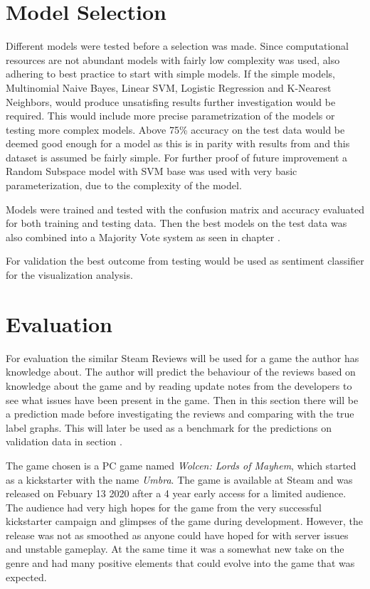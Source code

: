 \section{Model Selection}
\label{sec:model-selection}


Different models were tested before a selection was made. 
Since computational resources are not abundant models with fairly low complexity was used, also adhering to best practice to start with simple models.
If the simple models, Multinomial Naive Bayes, Linear SVM, Logistic Regression and K-Nearest Neighbors, would produce unsatisfing results further investigation would be required.
This would include more precise parametrization of the models or testing more complex models. 
Above 75\% accuracy on the test data would be deemed good enough for a model as this is in parity with results from \cite{gang-wang, rui-xia} and this dataset is assumed be fairly simple. 
For further proof of future improvement a Random Subspace model with SVM base was used with very basic parameterization, due to the complexity of the model.


Models were trained and tested with the confusion matrix and accuracy evaluated for both training and testing data.
Then the best models on the test data was also combined into a Majority Vote system as seen in chapter .


For validation the best outcome from testing would be used as sentiment classifier for the visualization analysis.


\section{Evaluation}
\label{sec:evaluation}


For evaluation the similar Steam Reviews will be used for a game the author has knowledge about. 
The author will predict the behaviour of the reviews based on knowledge about the game and by reading update notes from the developers to see what issues have been present in the game. 
Then in this section there will be a prediction made before investigating the reviews and comparing with the true label graphs. 
This will later be used as a benchmark for the predictions on validation data in section .


The game chosen is a PC game named \emph{Wolcen: Lords of Mayhem}, which started as a kickstarter with the name \emph{Umbra}. \cite{kickstarter} 
The game is available at Steam \cite{wolcen} and was released on Febuary 13 2020 after a 4 year early access for a limited audience. 
The audience had very high hopes for the game from the very successful kickstarter campaign and glimpses of the game during development. 
However, the release was not as smoothed as anyone could have hoped for with server issues and unstable gameplay. 
At the same time it was a somewhat new take on the genre and had many positive elements that could evolve into the game that was expected. 


